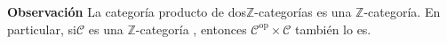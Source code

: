 \documentclass[preview]{standalone}
\begin{document}
\begin{center}
\flushleft \textbf{Observación} La categoría producto de dos$\mathbb{Z}$-categorías es una $\mathbb{Z}$-categoría. En particular, si$\mathscr{C}$ es una $\mathbb{Z}$-categoría , entonces $\mathscr{C}^\text{op}\times\mathscr{C}$ también lo es.
\end{center}
\end{document}
